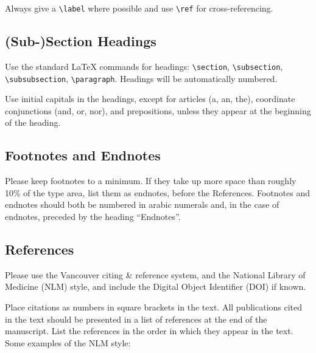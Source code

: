 \documentclass{IOS-Book-Article}
\begin{document}
Always give a \verb|\label| where possible and use \verb|\ref| for cross-referencing.


\subsection{(Sub-)Section Headings}
Use the standard \LaTeX{} commands for headings: {\small \verb|\section|, \verb|\subsection|, \verb|\subsubsection|, \verb|\paragraph|}.
Headings will be automatically numbered.

Use initial capitals in the headings, except for articles (a, an, the), coordinate
conjunctions (and, or, nor), and prepositions, unless they appear at the beginning
of the heading.

\subsection{Footnotes and Endnotes}
Please keep footnotes to a minimum. If they take up more space than roughly 10\% of
the type area, list them as endnotes, before the References. Footnotes and endnotes
should both be numbered in arabic numerals and, in the case of endnotes, preceded by
the heading ``Endnotes''.

\subsection{References}

Please use the Vancouver citing \& reference system, and the National Library of
Medicine (NLM) style, and include the Digital Object Identifier (DOI) if known.

Place citations as numbers in square brackets in the text. All publications cited in
the text should be presented in a list of references at the end of the manuscript.
List the references in the order in which they appear in the text. Some examples of
the NLM style:
\end{document}
